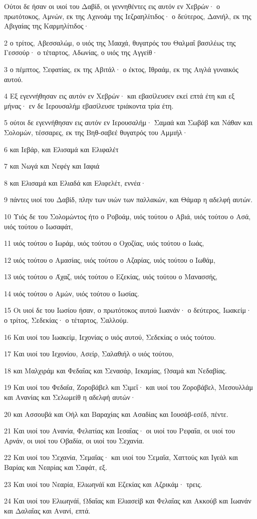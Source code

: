 \par Ούτοι δε ήσαν οι υιοί του Δαβίδ, οι γεννηθέντες εις αυτόν εν Χεβρών· ο πρωτότοκος, Αμνών, εκ της Αχινοάμ της Ιεζραηλίτιδος· ο δεύτερος, Δανιήλ, εκ της Αβιγαίας της Καρμηλίτιδος·
\par 2 ο τρίτος, Αβεσσαλώμ, ο υιός της Μααχά, θυγατρός του Θαλμαΐ βασιλέως της Γεσσούρ· ο τέταρτος, Αδωνίας, ο υιός της Αγγείθ·
\par 3 ο πέμπτος, Σεφατίας, εκ της Αβιτάλ· ο έκτος, Ιθραάμ, εκ της Αιγλά γυναικός αυτού.
\par 4 Εξ εγεννήθησαν εις αυτόν εν Χεβρών· και εβασίλευσεν εκεί επτά έτη και εξ μήνας· εν δε Ιερουσαλήμ εβασίλευσε τριάκοντα τρία έτη.
\par 5 ούτοι δε εγεννήθησαν εις αυτόν εν Ιερουσαλήμ· Σαμαά και Σωβάβ και Νάθαν και Σολομών, τέσσαρες, εκ της Βηθ-σαβεέ θυγατρός του Αμμιήλ·
\par 6 και Ιεβάρ, και Ελισαμά και Ελιφαλέτ
\par 7 και Νωγά και Νεφέγ και Ιαφιά
\par 8 και Ελισαμά και Ελιαδά και Ελιφελέτ, εννέα·
\par 9 πάντες υιοί του Δαβίδ, πλην των υιών των παλλακών, και Θάμαρ η αδελφή αυτών.
\par 10 Υιός δε του Σολομώντος ήτο ο Ροβοάμ, υιός τούτου ο Αβιά, υιός τούτου ο Ασά, υιός τούτου ο Ιωσαφάτ,
\par 11 υιός τούτου ο Ιωράμ, υιός τούτου ο Οχοζίας, υιός τούτου ο Ιωάς,
\par 12 υιός τούτου ο Αμασίας, υιός τούτου ο Αζαρίας, υιός τούτου ο Ιωθάμ,
\par 13 υιός τούτου ο Άχαζ, υιός τούτου ο Εζεκίας, υιός τούτου ο Μανασσής,
\par 14 υιός τούτου ο Αμών, υιός τούτου ο Ιωσίας.
\par 15 Οι υιοί δε του Ιωσίου ήσαν, ο πρωτότοκος αυτού Ιωανάν· ο δεύτερος, Ιωακείμ· ο τρίτος, Σεδεκίας· ο τέταρτος, Σαλλούμ.
\par 16 Και υιοί του Ιωακείμ, Ιεχονίας ο υιός αυτού, Σεδεκίας ο υιός τούτου.
\par 17 Και υιοί του Ιεχονίου, Ασείρ, Σαλαθιήλ ο υιός τούτου,
\par 18 και Μαλχιράμ και Φεδαΐας και Σενασάρ, Ιεκαμίας, Ωσαμά και Νεδαβίας.
\par 19 Και υιοί του Φεδαΐα, Ζοροβάβελ και Σιμεΐ· και υιοί του Ζοροβάβελ, Μεσουλλάμ και Ανανίας και Σελωμείθ η αδελφή αυτών·
\par 20 και Ασσουβά και Οήλ και Βαραχίας και Ασαδίας και Ιουσάβ-εσέδ, πέντε.
\par 21 Και υιοί του Ανανία, Φελατίας και Ιεσαΐας· οι υιοί του Ρεφαΐα, οι υιοί του Αρνάν, οι υιοί του Οβαδία, οι υιοί του Σεχανία.
\par 22 Και υιοί του Σεχανία, Σεμαΐας· και υιοί του Σεμαΐα, Χαττούς και Ιγεάλ και Βαρίας και Νεαρίας και Σαφάτ, εξ.
\par 23 Και υιοί του Νεαρία, Ελιωηνάϊ και Εζεκίας και Αζρικάμ· τρεις.
\par 24 Και υιοί του Ελιωηνάϊ, Ωδαΐας και Ελιασείβ και Φελαΐας και Ακκούβ και Ιωανάν και Δαλαΐας και Ανανί, επτά.


